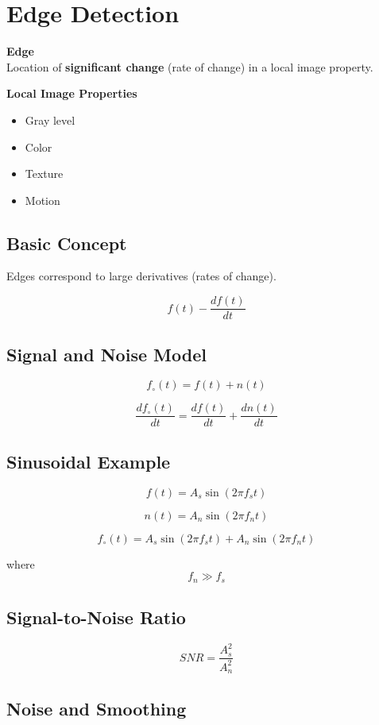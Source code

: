 \documentclass[11pt]{article}
\theoremstyle{definition}
\begin{document}
\newpage
\section{Edge Detection}

\textbf{Edge} \\
Location of \textbf{significant change} (rate of change) in a local image property.

\medskip
\noindent \textbf{Local Image Properties}
\begin{itemize}
    \item Gray level
    \item Color
    \item Texture
    \item Motion
\end{itemize}

\subsection*{Basic Concept}

Edges correspond to large derivatives (rates of change).

\[
f(t) - \frac{df(t)}{dt}
\]

\subsection*{Signal and Noise Model}

\[
f_{\circ}(t) = f(t) + n(t)
\]

\[
\frac{df_{\circ}(t)}{dt} = \frac{df(t)}{dt} + \frac{dn(t)}{dt}
\]

\subsection*{Sinusoidal Example}

\[
f(t) = A_s \sin(2\pi f_s t)
\]

\[
n(t) = A_n \sin(2\pi f_n t)
\]

\[
f_{\circ}(t) = A_s \sin(2\pi f_s t) + A_n \sin(2\pi f_n t)
\]

where 
\[
f_n \gg f_s
\]

\subsection*{Signal-to-Noise Ratio}

\[
SNR = \frac{A_s^2}{A_n^2}
\]

\subsection*{Noise and Smoothing}
\end{document}
